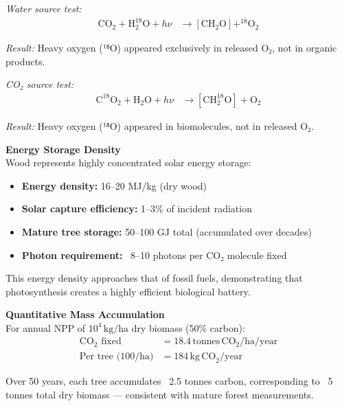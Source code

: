 \begin{technical}
\vspace{0.3em}
\noindent\textit{Water source test:}
\begin{align}
\mathrm{CO}_2 + \mathrm{H}_2^{18}\mathrm{O} + h\nu 
&\rightarrow [\mathrm{CH}_2\mathrm{O}] + ^{18}\mathrm{O}_2
\end{align}

\noindent\textit{Result:} Heavy oxygen (¹⁸O) appeared exclusively in released O₂, not in organic products.

\vspace{0.3em}
\noindent\textit{CO₂ source test:}
\begin{align}
\mathrm{C}^{18}\mathrm{O}_2 + \mathrm{H}_2\mathrm{O} + h\nu 
&\rightarrow [\mathrm{CH}_2^{18}\mathrm{O}] + \mathrm{O}_2
\end{align}

\noindent\textit{Result:} Heavy oxygen (¹⁸O) appeared in biomolecules, not in released O₂.

\noindent\textbf{Energy Storage Density}\\[0.5em]
Wood represents highly concentrated solar energy storage:

\begin{itemize}[leftmargin=*]
  \item \textbf{Energy density:} 16–20 MJ/kg (dry wood)
  \item \textbf{Solar capture efficiency:} 1–3\% of incident radiation
  \item \textbf{Mature tree storage:} 50–100 GJ total (accumulated over decades)
  \item \textbf{Photon requirement:} ~8–10 photons per CO₂ molecule fixed
\end{itemize}

This energy density approaches that of fossil fuels, demonstrating that photosynthesis creates a highly efficient biological battery.

\noindent\textbf{Quantitative Mass Accumulation}\\[0.5em]
For annual NPP of \(10^4\,\mathrm{kg/ha}\) dry biomass (50\% carbon):
\begin{align}
\text{CO}_2\text{ fixed} &= 18.4\,\mathrm{tonnes\,CO}_2/\mathrm{ha}/\mathrm{year} \\
\text{Per tree (100/ha)} &= 184\,\mathrm{kg\,CO}_2/\mathrm{year}
\end{align}

Over 50 years, each tree accumulates ~2.5 tonnes carbon, corresponding to ~5 tonnes total dry biomass — consistent with mature forest measurements.


\end{technical}
